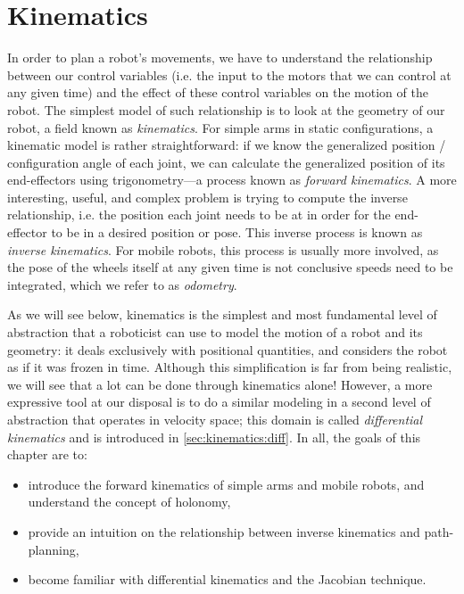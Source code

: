 \chapter{Kinematics}\label{chap:kinematics}

In order to plan a robot's movements, we have to understand the relationship between our control variables (i.e. the input to the motors that we can control at any given time) and the effect of these control variables on the motion of the robot.
The simplest model of such relationship is to look at the geometry of our robot, a field known as \textsl{kinematics}.
For simple arms in static configurations, a kinematic model is rather straightforward: if we know the generalized position / configuration angle of each joint, we can calculate the generalized position of its end-effectors using trigonometry---a process known as \textsl{forward kinematics}.
A more interesting, useful, and complex problem is trying to compute the inverse relationship, i.e. the position each joint needs to be at in order for the end-effector to be in a desired position or pose. This inverse process is known as \textsl{inverse kinematics}.
For mobile robots, this process is usually more involved, as the pose of the wheels itself at any given time is not conclusive speeds need to be integrated, which we refer to as \textsl{odometry}.

As we will see below, kinematics is the simplest and most fundamental level of abstraction that a roboticist can use to model the motion of a robot and its geometry: it deals exclusively with positional quantities, and considers the robot as if it was frozen in time. Although this simplification is far from being realistic, we will see that a lot can be done through kinematics alone! However, a more expressive tool at our disposal is to do a similar modeling in a second level of abstraction that operates in velocity space; this domain is called \textsl{differential kinematics} and is introduced in \cref{sec:kinematics:diff}.
In all, the goals of this chapter are to:

\begin{itemize}
\item introduce the forward kinematics of simple arms and mobile robots, and understand the concept of holonomy,
\item provide an intuition on the relationship between inverse kinematics and path-planning,
\item become familiar with differential kinematics and the Jacobian technique.
\end{itemize}

